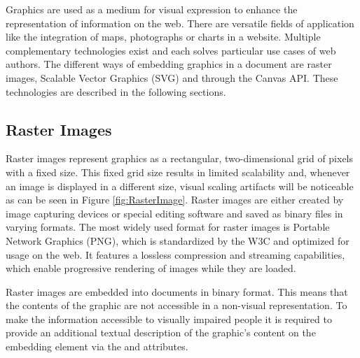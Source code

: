 Graphics are used as a medium for visual expression to enhance the representation of information on the web. 
There are versatile fields of application like the integration of maps, photographs or charts in a website. 
Multiple complementary technologies exist and each solves particular use cases of web authors. 
The different ways of embedding graphics in a document are raster images, Scalable Vector Graphics (SVG) and through the Canvas API. 
These technologies are described in the following sections.

\subsection{Raster Images}
\label{sec:RasterImages}

Raster images represent graphics as a rectangular, two-dimensional grid of pixels with a fixed size. 
This fixed grid size results in limited scalability and, whenever an image is displayed in a different size, visual scaling artifacts will be noticeable as can be seen in Figure \ref{fig:RasterImage}. 
Raster images are either created by image capturing devices or special editing software and saved as binary files in varying formats. 
The most widely used format for raster images is Portable Network Graphics (PNG), which is standardized by the W3C \parencite{PNG} and optimized for usage on the web. 
It features a lossless compression and streaming capabilities, which enable progressive rendering of images while they are loaded.

Raster images are embedded into documents in binary format. 
This means that the contents of the graphic are not accessible in a non-visual representation. 
To make the information accessible to visually impaired people it is required to provide an additional textual description of the graphic's content on the embedding element via the  and  attributes.

